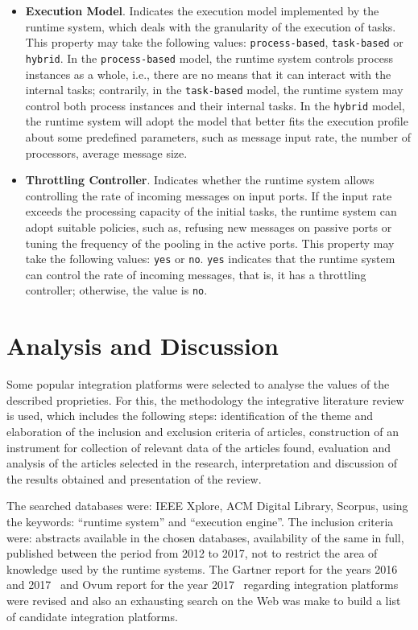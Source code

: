 \begin{itemize}
%
\item \textbf{Execution Model}. Indicates the execution model implemented by the runtime system, which deals with the granularity of the execution of tasks. This property may take the following values: \texttt{process-based}, \texttt{task-based} or \texttt{hybrid}. In the \texttt{process-based} model, the runtime system controls process instances as a whole, i.e., there are no means that it can interact with the internal tasks; contrarily, in the \texttt{task-based} model, the runtime system may control both process instances and their internal tasks. In the \texttt{hybrid} model, the runtime system will adopt the model that better fits the execution profile about some predefined parameters, such as message input rate, the number of processors, average message size. 
%
\item \textbf{Throttling Controller}. Indicates whether the runtime system allows controlling the rate of incoming messages on input ports. If the input rate exceeds the processing capacity of the initial tasks, the runtime system can adopt suitable policies, such as, refusing new messages on passive ports or tuning the frequency of the pooling in the active ports. This property may take the following values: \texttt{yes} or \texttt{no}. \texttt{yes} indicates that the runtime system can control the rate of incoming messages, that is, it has a throttling controller; otherwise, the value is \texttt{no}. 
\end{itemize}
\section{Analysis and Discussion}
\label{sec:analysis}

Some popular integration platforms were selected to analyse the values of the described proprieties. For this, the methodology the integrative literature review is used, which includes the following steps: identification of the theme and elaboration of the inclusion and exclusion criteria of articles, construction of an instrument for collection of relevant data of the articles found, evaluation and analysis of the articles selected in the research, interpretation and discussion of the results obtained and presentation of the review.

The searched databases were: IEEE Xplore, ACM Digital Library, Scorpus, using the keywords: ``runtime system'' and ``execution engine''. The inclusion criteria were: abstracts available in the chosen databases, availability of the same in full, published between the period from 2012 to 2017, not to restrict the area of knowledge used by the runtime systems.
The Gartner report for the years 2016~\cite{gartner2016} and 2017~\cite{guttridge2017} and Ovum report for the year 2017~\cite{sharma2017} regarding integration platforms were revised and also an exhausting search on the Web was make to build a list of candidate integration platforms.

